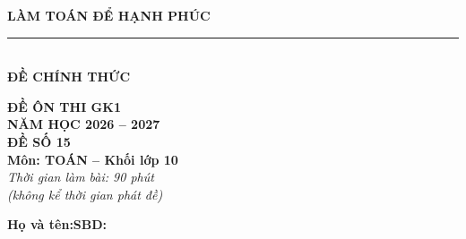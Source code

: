 \documentclass[12pt,a4paper]{article}
\begin{document}
\noindent
\begin{minipage}[c]{0.38\textwidth}
    \centering
    \textbf{LÀM TOÁN ĐỂ HẠNH PHÚC}\\[-2pt]
    \rule{3.2cm}{0.6pt}\\[4pt]
    \textbf{ĐỀ CHÍNH THỨC}
\end{minipage}\hfill
\begin{minipage}[c]{0.35\textwidth}
    \centering
    \textbf{ĐỀ ÔN THI GK1}\\
    \textbf{NĂM HỌC 2026 -- 2027}\\[2pt]
    \textbf{ĐỀ SỐ 15}\\
    \textbf{Môn: TOÁN -- Khối lớp 10}\\
    \textit{\small Thời gian làm bài: 90 phút\\(không kể thời gian phát đề)}
\end{minipage}

\vspace{0.2cm}
\noindent
\begin{minipage}[b]{0.78\textwidth}
    \textbf{Họ và tên:}\dotfill\textbf{SBD:}\makebox[3.5cm]{\dotfill}
\end{minipage}\hfill
\begin{minipage}[b]{0.20\textwidth}
    \hfill
    \setlength{\fboxrule}{0.8pt}%
\end{minipage}
\vspace{0.2cm}
\end{document}
